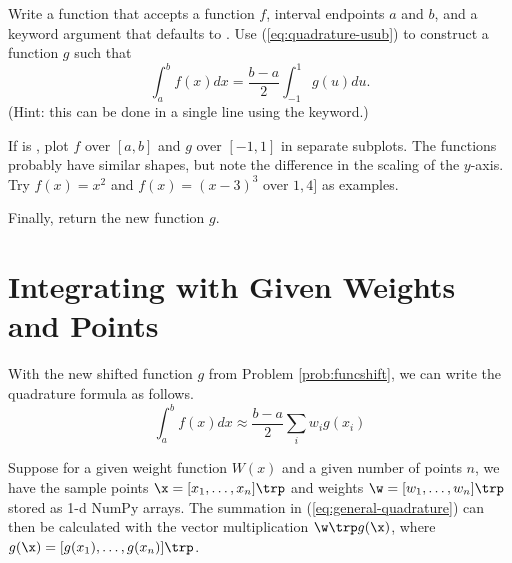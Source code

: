 \begin{problem} %
Write a function that accepts a function $f$, interval endpoints $a$ and $b$, and a keyword argument  that defaults to .
Use (\ref{eq:quadrature-usub}) to construct a function $g$ such that \[\int_a^b f(x)dx = \frac{b - a}{2}\int_{-1}^1 g(u)du.\]
(Hint: this can be done in a single line using the  keyword.)

If  is , plot $f$ over $[a,b]$ and $g$ over $[-1,1]$ in separate subplots.
The functions probably have similar shapes, but note the difference in the scaling of the $y$-axis.
Try $f(x) = x^2$ and $f(x) = (x - 3)^3$ over $1,4]$ as examples.

Finally, return the new function $g$.
\label{prob:funcshift}
\end{problem}

\begin{comment} %
As an example, let $f(x) = x^2$ on $[1,4]$.
We know that $\left.\int_1^4 x^2 dx = \frac{x^3}{3}\right|_1^4 = 21$.
Then setting
\begin{align*}
g(x) &= \frac{b - a}{2}f\left(\frac{b-a}{2}x + \frac{b+a}{2}\right) \\
& = \frac{3}{2}\left(\frac{3}{2}x + \frac{5}{2}\right)^2 \\
&= \frac{27}{8}x^2 + \frac{45}{8}x + \frac{75}{8},
\end{align*}
the interval-adjusted integral of $f(x)$ is given by
\begin{align*}
\int_a^b f(x)dx = \int_{-1}^1 g(x)dx = \left.\frac{9}{8} x^3 + \frac{45}{4} x^2 + \frac{75}{8} x\right|_{-1}^1 = 21.
\end{align*}
\end{comment}

\section*{Integrating with Given Weights and Points} %

With the new shifted function $g$ from Problem \ref{prob:funcshift}, we can write the quadrature formula as follows.
\begin{equation}
\int_a^b f(x) dx \approx \frac{b - a}{2} \sum_i w_i g(x_i)
\label{eq:general-quadrature}
\end{equation}

Suppose for a given weight function $W(x)$ and a given number of points $n$, we have the sample points $\x = [x_1,\ldots,x_n]\trp$ and weights $\w = [w_1,\ldots,w_n]\trp$ stored as 1-d NumPy arrays.
The summation in (\ref{eq:general-quadrature}) can then be calculated with the vector multiplication $\w\trp g(\x)$, where $g(\x) = [g(x_1),\ldots,g(x_n)]\trp$.

